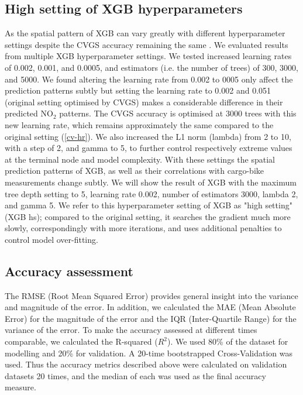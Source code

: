 \documentclass{article}
\begin{document}
\subsection{High setting of XGB hyperparameters}
As the spatial pattern of XGB can vary greatly with different hyperparameter settings despite the CVGS accuracy remaining the same \citep{luglobal}. We evaluated results from multiple XGB hyperparameter settings. We tested increased learning rates of 0.002, 0.001, and 0.0005, and estimators (i.e. the number of trees) of 300, 3000, and 5000. We found altering the learning rate from 0.002 to 0005 only affect the prediction patterns subtly but setting the learning rate to 0.002 and 0.051 (original setting optimised by CVGS) makes a considerable difference in their predicted NO$_2$ patterns. The CVGS accuracy is optimised at 3000 trees with this new learning rate, which remains approximately the same compared to the original setting (\cref{cv-hr}). We also increased the L1 norm (lambda) from 2 to 10, with a step of 2, and gamma \citep{chen2016xgboost} to 5, to further control respectively extreme values at the terminal node and model complexity. With these settings the spatial prediction patterns of XGB, as well as their correlations with cargo-bike measurements change subtly. We will show the result of XGB with the maximum tree depth setting to 5, learning rate 0.002, number of estimators 3000, lambda 2, and gamma 5. We refer to this hyperparameter setting of XGB as "high setting" (XGB hs); compared to the original setting, it searches the gradient much more slowly, correspondingly with more iterations, and uses additional penalties to control model over-fitting. 

 
\subsection{Accuracy assessment}

The RMSE (Root Mean Squared Error) provides general insight into the variance and magnitude of the error. In addition, we calculated the MAE (Mean Absolute Error) for the magnitude of the error and the IQR (Inter-Quartile Range) for the variance of the error. To make the accuracy assessed at different times comparable, we calculated the R-squared ($R^2$). We used 80\% of the dataset for modelling and 20\% for validation. A 20-time bootstrapped Cross-Validation was used. Thus the accuracy metrics described above were calculated on validation datasets 20 times, and the median of each was used as the final accuracy measure.    
\end{document}
